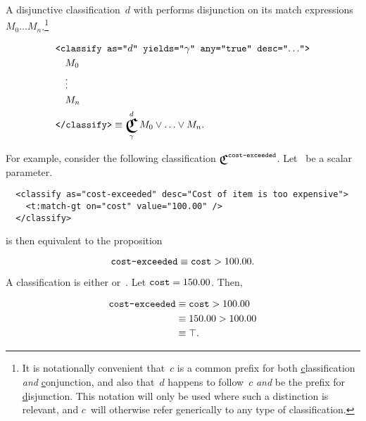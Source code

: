 \begin{definition}
  A disjunctive classification~$d$ with 
    performs disjunction on its match expressions
    $M_0\ldots M_n$.\footnote{%
      It is notationally convenient that~$c$ is a common prefix for both
        \underline{c}lassification \emph{and} \underline{c}onjunction,
          and also that~$d$ happens to follow~$c$ \emph{and} be the prefix for
          \underline{d}isjunction.
      This notation will only be used where such a distinction is relevant,
        and $c$~will otherwise refer generically to any type of
        classification.}

  \begin{align*}
    &\xml{<classify as="$d$" yields="$\gamma$" any="true" desc="$\ldots$">} \\
    &\quad M_0 \\
    &\quad \vdots \\
    &\quad M_n \\
    &\texttt{</classify>}
      \equiv \Classify^d_\gamma M_0 \lor \ldots \lor M_n.
  \end{align*}
\end{definition}

For example,
  consider the following classification $\Classify^\texttt{cost-exceeded}$.
Let~ be a scalar parameter.

\begin{lstlisting}
  <classify as="cost-exceeded" desc="Cost of item is too expensive">
    <t:match-gt on="cost" value="100.00" />
  </classify>
\end{lstlisting}

\noindent
is then equivalent to the proposition

\begin{equation*}
  \texttt{cost-exceeded} \equiv \texttt{cost} > 100.00.
\end{equation*}

A classification is either \true or~\false.
Let $\texttt{cost}=150.00$.
Then,

\begin{align*}
  \texttt{cost-exceeded} & \equiv \texttt{cost} > 100.00 \\
                            & \equiv 150.00 > 100.00 \\
                            & \equiv \top.
\end{align*}

